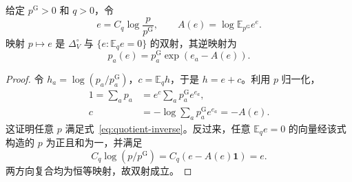 \documentclass[lang=cn,scheme=chinese,openany]{../book/elegantbook}
\newcommand{\E}{\mathbb E}
\begin{document}
\begin{theorem}[归一化分布与中心化误差的一一对应]
\label{thm:quotient-bijection}
给定 $p^{\mathrm G}>0$ 和 $q>0$，令
\begin{equation}
e=C_q\log\frac{p}{p^{\mathrm G}},\qquad
A(e)=\log\E_{p^{\mathrm G}}e^{e}.
\end{equation}
映射 $p\mapsto e$ 是 $\Delta_V^\circ$ 与 $\{e:\E_q e=0\}$ 的双射，其逆映射为
\begin{equation}
p_a(e)=p_a^{\mathrm G}\exp(e_a-A(e)).
\label{eq:quotient-inverse}
\end{equation}
\end{theorem}
\begin{proof}
令 $h_a=\log(p_a/p_a^{\mathrm G})$，$c=\E_qh$，于是 $h=e+c$。利用 $p$ 归一化，
\begin{align}
1=\sum_a p_a&=e^c\sum_a p_a^{\mathrm G}e^{e_a},\\
c&=-\log\sum_a p_a^{\mathrm G}e^{e_a}=-A(e).
\end{align}
这证明任意 $p$ 满足式~\eqref{eq:quotient-inverse}。反过来，任意 $\E_q e=0$ 的向量经该式构造的 $p$ 为正且和为一，并满足
\begin{equation}
C_q\log(p/p^{\mathrm G})=C_q(e-A(e)\mathbf1)=e.
\end{equation}
两方向复合均为恒等映射，故双射成立。
\end{proof}
\end{document}
